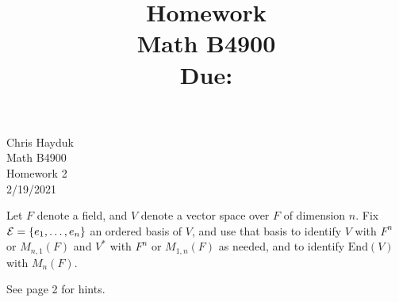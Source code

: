 \documentclass[11pt, reqno]{amsart}
\title[Homework \HW]{Homework \HW \\
Math B4900\\
\small Due: \DUE}
\author{}
\theoremstyle{plain}
\theoremstyle{definition}
\theoremstyle{example}
\def\End{\mathrm{End}}
\def\HW{2}
\def\DUE{2/19/2021}
\begin{document}
\begin{flushright}
Chris Hayduk\\
Math B4900\\
Homework \HW\\
\DUE
\end{flushright}

Let $F$ denote a field, and $V$ denote a vector space over $F$ of dimension $n$. Fix $\mathcal{E} = \{e_1, \dots, e_n\}$ an ordered basis of $V$, and use that basis to identify $V$ with $F^n$ or $M_{n,1}(F)$ and $V^*$ with $F^n$ or $M_{1,n}(F)$ as needed, and to identify $\End(V)$ with $M_n(F)$. 


\medskip

See page 2 for hints.
\end{document}
